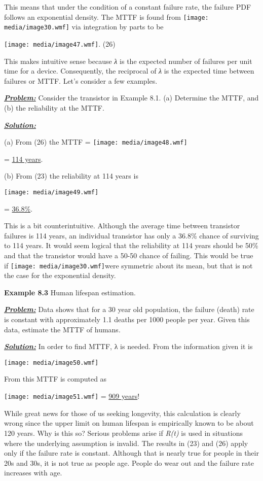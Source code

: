 This means that under the condition of a constant failure rate, the
failure PDF follows an exponential density. The MTTF is found from
\texttt{[image: media/image30.wmf]} via integration by parts to be

\texttt{[image: media/image47.wmf]}. (26)

This makes intuitive sense because \emph{λ} is the expected number of
failures per unit time for a device. Consequently, the reciprocal of
\emph{λ} is the expected time between failures or MTTF. Let's consider a
few examples.

\emph{\textbf{\ul{Problem:}}} Consider the transistor in Example 8.1.
(a) Determine the MTTF, and (b) the reliability at the MTTF.

\emph{\textbf{\ul{Solution:}}}

(a) From (26) the MTTF = \texttt{[image: media/image48.wmf]}

= \ul{114 years}.

(b) From (23) the reliability at 114 years is

\texttt{[image: media/image49.wmf]}

= \ul{36.8\%}.

This is a bit counterintuitive. Although the average time between
transistor failures is 114 years, an individual transistor has only a
36.8\% chance of surviving to 114 years. It would seem logical that the
reliability at 114 years should be 50\% and that the transistor would
have a 50-50 chance of failing. This would be true if
\texttt{[image: media/image30.wmf]}were symmetric about its mean, but
that is not the case for the exponential density.

\textbf{Example 8.3} Human lifespan estimation.

\emph{\textbf{\ul{Problem:}}} Data shows that for a 30 year old
population, the failure (death) rate is constant with approximately 1.1
deaths per 1000 people per year. Given this data, estimate the MTTF of
humans.

\emph{\textbf{\ul{Solution:}}} In order to find MTTF, λ is needed. From
the information given it is

\texttt{[image: media/image50.wmf]}

From this MTTF is computed as

\texttt{[image: media/image51.wmf]} = \ul{909 years}!

While great news for those of us seeking longevity, this calculation is
clearly wrong since the upper limit on human lifespan is empirically
known to be about 120 years. Why is this so? Serious problems arise if
\emph{R(t)} is used in situations where the underlying assumption is
invalid. The results in (23) and (26) apply only if the failure rate is
constant. Although that is nearly true for people in their 20s and 30s,
it is not true as people age. People do wear out and the failure rate
increases with age.

